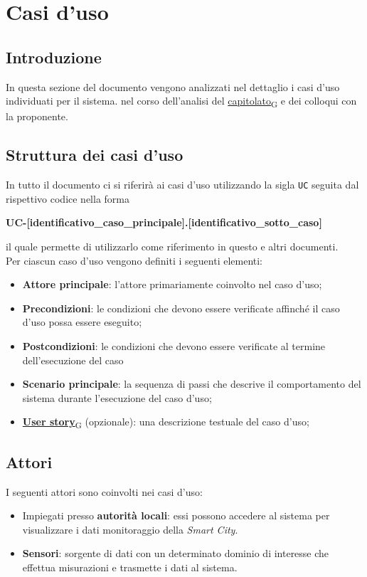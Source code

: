 \section{Casi d'uso}
\subsection{Introduzione}
In questa sezione del documento vengono analizzati nel dettaglio i casi d'uso individuati per il sistema.
nel corso dell'analisi del \href{https://7last.github.io/docs/rtb/documentazione-interna/glossario\#capitolato}{capitolato\textsubscript{G}} e dei colloqui con la proponente.

\subsection{Struttura dei casi d'uso}
In tutto il documento ci si riferirà ai casi d'uso utilizzando la sigla \texttt{UC} seguita dal rispettivo codice nella forma
\begin{center}
	\textbf{UC-[identificativo\_caso\_principale].[identificativo\_sotto\_caso]}
\end{center}

il quale permette di utilizzarlo come riferimento in questo e altri documenti.\\
Per ciascun caso d'uso vengono definiti i seguenti elementi:
\begin{itemize}
	\item \textbf{Attore principale}: l'attore primariamente coinvolto nel caso d'uso;
	\item \textbf{Precondizioni}: le condizioni che devono essere verificate affinché il caso d'uso possa essere
	      eseguito;
	\item \textbf{Postcondizioni}: le condizioni che devono essere verificate al termine dell'esecuzione del caso
	\item \textbf{Scenario principale}: la sequenza di passi che descrive il comportamento del sistema durante
	      l'esecuzione del caso d'uso;
	\item \href{https://7last.github.io/docs/rtb/documentazione-interna/glossario\#user-story}{\textbf{User story}\textsubscript{G}} (opzionale): una descrizione testuale del caso d'uso;
\end{itemize}


\subsection{Attori}
I seguenti attori sono coinvolti nei casi d'uso:
\begin{itemize}
	\item Impiegati presso \textbf{autorità locali}: essi possono accedere al sistema per visualizzare i dati
	      monitoraggio della \textit{Smart City}.
	\item \textbf{Sensori}: sorgente di dati con un determinato dominio di interesse che effettua misurazioni
	      e trasmette i dati al sistema.
\end{itemize}

